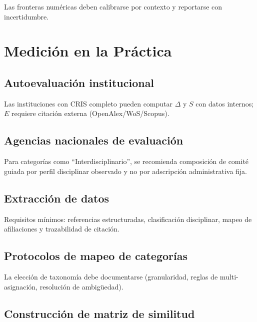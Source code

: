 \documentclass[
]{article}
\begin{document}
Las fronteras numéricas deben calibrarse por contexto y reportarse con
incertidumbre.

\hypertarget{mediciuxf3n-en-la-pruxe1ctica}{%
\section{Medición en la Práctica}\label{mediciuxf3n-en-la-pruxe1ctica}}

\hypertarget{autoevaluaciuxf3n-institucional}{%
\subsection{Autoevaluación
institucional}\label{autoevaluaciuxf3n-institucional}}

Las instituciones con CRIS completo pueden computar \(\Delta\) y \(S\)
con datos internos; \(E\) requiere citación externa
(OpenAlex/WoS/Scopus).

\hypertarget{agencias-nacionales-de-evaluaciuxf3n}{%
\subsection{Agencias nacionales de
evaluación}\label{agencias-nacionales-de-evaluaciuxf3n}}

Para categorías como ``Interdisciplinario'', se recomienda composición
de comité guiada por perfil disciplinar observado y no por adscripción
administrativa fija.

\hypertarget{extracciuxf3n-de-datos}{%
\subsection{Extracción de datos}\label{extracciuxf3n-de-datos}}

Requisitos mínimos: referencias estructuradas, clasificación
disciplinar, mapeo de afiliaciones y trazabilidad de citación.

\hypertarget{protocolos-de-mapeo-de-categoruxedas}{%
\subsection{Protocolos de mapeo de
categorías}\label{protocolos-de-mapeo-de-categoruxedas}}

La elección de taxonomía debe documentarse (granularidad, reglas de
multi-asignación, resolución de ambigüedad).

\hypertarget{construcciuxf3n-de-matriz-de-similitud}{%
\subsection{Construcción de matriz de
similitud}\label{construcciuxf3n-de-matriz-de-similitud}}
\end{document}
